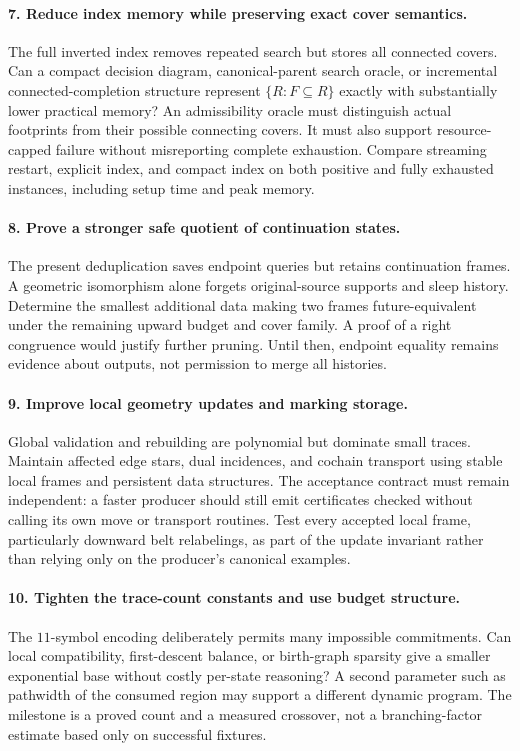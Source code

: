 \paragraph{7. Reduce index memory while preserving exact cover semantics.}
The full inverted index removes repeated search but stores all connected
covers. Can a compact decision diagram, canonical-parent search oracle,
or incremental connected-completion structure represent
$\{R:F\subseteq R\}$ exactly with substantially lower practical memory?
An admissibility oracle must distinguish actual footprints from their
possible connecting covers. It must also support resource-capped failure
without misreporting complete exhaustion. Compare streaming restart,
explicit index, and compact index on both positive and fully exhausted
instances, including setup time and peak memory.

\paragraph{8. Prove a stronger safe quotient of continuation states.}
The present deduplication saves endpoint queries but retains continuation
frames. A geometric isomorphism alone forgets original-source supports and
sleep history. Determine the smallest additional data making two frames
future-equivalent under the remaining upward budget and cover family.
A proof of a right congruence would justify further pruning. Until then,
endpoint equality remains evidence about outputs, not permission to merge
all histories.

\paragraph{9. Improve local geometry updates and marking storage.}
Global validation and rebuilding are polynomial but dominate small traces.
Maintain affected edge stars, dual incidences, and cochain transport using
stable local frames and persistent data structures. The acceptance contract
must remain independent: a faster producer should still emit certificates
checked without calling its own move or transport routines. Test every
accepted local frame, particularly downward belt relabelings, as part of
the update invariant rather than relying only on the producer's canonical
examples.

\paragraph{10. Tighten the trace-count constants and use budget structure.}
The $11$-symbol encoding deliberately permits many impossible commitments.
Can local compatibility, first-descent balance, or birth-graph sparsity give
a smaller exponential base without costly per-state reasoning? A second
parameter such as pathwidth of the consumed region may support a different
dynamic program. The milestone is a proved count and a measured crossover,
not a branching-factor estimate based only on successful fixtures.

